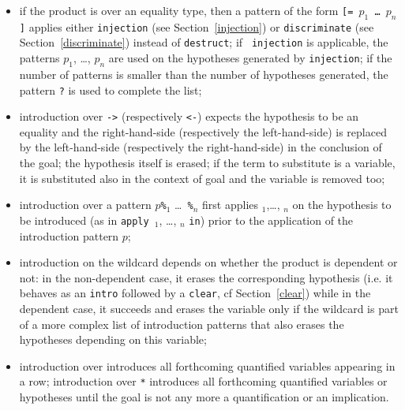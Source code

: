 \begin{coq_example*}
\begin{itemize}
  constructors such as {\tt conj} or {\tt ex\_intro}; for instance, an
  hypothesis with type {\tt A\verb|/\|(exists x, B\verb|/\|C\verb|/\|D)} can be
  introduced via pattern {\tt (a \& x \& b \& c \& d)};
\item if the product is over an equality type, then a pattern of the
  form {\tt [= $p_{1}$ \dots\ $p_n$]} applies either {\tt injection}
  (see Section~\ref{injection}) or {\tt discriminate} (see
  Section~\ref{discriminate}) instead of {\tt destruct}; if {\tt
    injection} is applicable, the patterns $p_1$, \ldots, $p_n$ are
  used on the hypotheses generated by {\tt injection}; if the number
  of patterns is smaller than the number of hypotheses generated, the
  pattern \texttt{?} is used to complete the list;
\item introduction over {\tt ->} (respectively {\tt <-}) expects the
  hypothesis to be an equality and the right-hand-side (respectively
  the left-hand-side) is replaced by the left-hand-side (respectively
  the right-hand-side) in the conclusion of the goal; the hypothesis
  itself is erased; if the term to substitute is a variable, it is
  substituted also in the context of goal and the variable is removed
  too;
\item introduction over a pattern $p${\tt \%{\term$_1$}} \ldots {\tt
  \%{\term$_n$}} first applies {\term$_1$},\ldots, {\term$_n$} on the
  hypothesis to be introduced (as in {\tt apply }{\term}$_1$, \ldots,
  {\term}$_n$ {\tt in}) prior to the application of the introduction
  pattern $p$;
\item introduction on the wildcard depends on whether the product is
  dependent or not: in the non-dependent case, it erases the
  corresponding hypothesis (i.e. it behaves as an {\tt intro} followed
  by a {\tt clear}, cf Section~\ref{clear}) while in the dependent
  case, it succeeds and erases the variable only if the wildcard is
  part of a more complex list of introduction patterns that also
  erases the hypotheses depending on this variable;
\item introduction over {\tt *} introduces all forthcoming quantified
  variables appearing in a row; introduction over {\tt **} introduces
  all forthcoming quantified variables or hypotheses until the goal is
  not any more a quantification or an implication.
\end{itemize}

\Example


\end{coq_example*}

